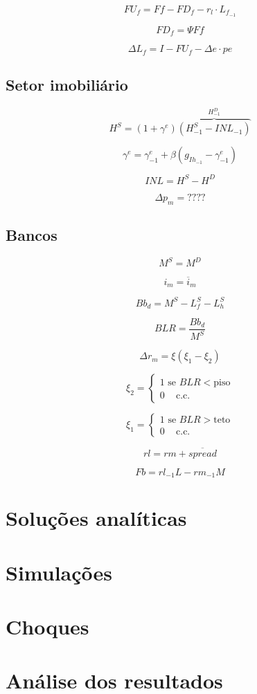\documentclass[11pt]{article}
\begin{document}
\[
FU_f = Ff - FD_f - r_l\cdot L_{f_{-1}}
\]

\[
FD_f = \Psi Ff
\]

\[
\Delta L_f = I - FU_f - \Delta e \cdot pe
\]

    \hypertarget{setor-imobiliuxe1rio}{%
\subsection{Setor imobiliário}\label{setor-imobiliuxe1rio}}

\[
H^S = (1+\gamma^e )\overbrace{(H^S_{-1} - INL_{-1})}^{H^D_{-1}}
\]

\[
\gamma^e = \gamma^e_{-1} +\beta (g_{Ih_{-1}} - \gamma^e_{-1})
\]

\[
INL = H^S - H^D
\]

\[
\Delta p_m = ????
\]

    \hypertarget{bancos}{%
\subsection{Bancos}\label{bancos}}

\[
M^S = M^D
\]

\[
i_m = \overline i_m
\]

\[
Bb_d = M^S - L_f^S - L_h^S 
\]

\[
BLR = \frac{Bb_{d}}{M^S}
\]

\[
\Delta r_m = \xi (\xi_1 - \xi_2)
\]

\[
\xi_2 = 
\begin{cases}
1 \text{ se } BLR < \text{piso}\\
0 \,\,\,\,\,\,\, \text{c.c.}
\end{cases}
\]

\[
\xi_1 = 
\begin{cases}
1 \text{ se } BLR > \text{teto}\\
0 \,\,\,\,\,\,\, \text{c.c.}
\end{cases}
\]

\[
rl = rm + \overline{spread}
\]

\[
Fb = rl_{-1}L - rm_{-1}M
\]

    \hypertarget{soluuxe7uxf5es-analuxedticas}{%
\section{Soluções analíticas}\label{soluuxe7uxf5es-analuxedticas}}

    \hypertarget{simulauxe7uxf5es}{%
\section{Simulações}\label{simulauxe7uxf5es}}

    \hypertarget{choques}{%
\section{Choques}\label{choques}}

    \hypertarget{anuxe1lise-dos-resultados}{%
\section{Análise dos resultados}\label{anuxe1lise-dos-resultados}}


    
    
    
    
\end{document}

